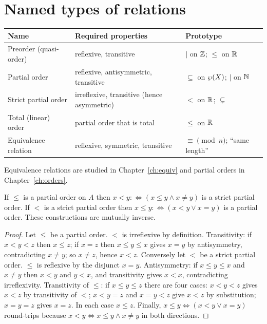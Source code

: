 \section{Named types of relations}

\begin{center}
	\begin{tabular}{@{}p{3.4cm}p{6cm}p{5.2cm}@{}}
		\toprule
		\textbf{Name} & \textbf{Required properties} & \textbf{Prototype}\\
		\midrule
		Preorder (quasi-order) & reflexive, transitive & $\mid$ on $\mathbb{Z}$; $\le$ on $\mathbb{R}$\\
		Partial order & reflexive, antisymmetric, transitive & $\subseteq$ on $\wp(X)$; $\mid$ on $\mathbb{N}$\\
		Strict partial order & irreflexive, transitive (hence asymmetric) & $<$ on $\mathbb{R}$; $\subsetneq$\\
		Total (linear) order & partial order that is total & $\le$ on $\mathbb{R}$\\
		Equivalence relation & reflexive, symmetric, transitive & $\equiv\pmod n$; ``same length''\\
		\bottomrule
	\end{tabular}
\end{center}

Equivalence relations are studied in Chapter~\ref{ch:equiv} and partial orders in Chapter~\ref{ch:orders}.

\begin{proposition}\label{prop:strict-nonstrict}
	If $\le$ is a partial order on $A$ then $x<y:\iff(x\le y\wedge x\ne y)$ is a strict partial order. If $<$ is a strict partial order then $x\le y:\iff(x<y\vee x=y)$ is a partial order. These constructions are mutually inverse.
\end{proposition}
\begin{proof}
	Let $\le$ be a partial order. $<$ is irreflexive by definition. Transitivity: if $x<y<z$ then $x\le z$; if $x=z$ then $x\le y\le x$ gives $x=y$ by antisymmetry, contradicting $x\ne y$; so $x\ne z$, hence $x<z$. Conversely let $<$ be a strict partial order. $\le$ is reflexive by the disjunct $x=y$. Antisymmetry: if $x\le y\le x$ and $x\ne y$ then $x<y$ and $y<x$, and transitivity gives $x<x$, contradicting irreflexivity. Transitivity of $\le$: if $x\le y\le z$ there are four cases: $x<y<z$ gives $x<z$ by transitivity of $<$; $x<y=z$ and $x=y<z$ give $x<z$ by substitution; $x=y=z$ gives $x=z$. In each case $x\le z$. Finally, $x\le y\iff(x<y\vee x=y)$ round-trips because $x<y\iff x\le y\wedge x\ne y$ in both directions.
\end{proof}

